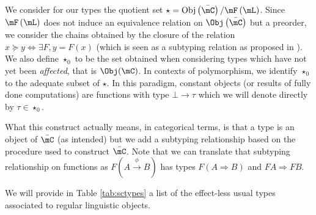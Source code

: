 \documentclass[math, english, info]{cours}
\begin{document}
We consider for our types the quotient set $\star = \mathrm{Obj}\left( \bar{\mC} \right)/\mF\left( \mL \right)$.
Since $\mF\left( \mL \right)$ does not induce an equivalence relation on $\Obj\left( \bar{\mC} \right)$ but a preorder, we consider the chains obtained by the closure of the relation $x\succeq y \Leftrightarrow \exists F, y = F(x)$ (which is seen as a subtyping relation as proposed in ).
We also define $\star_{0}$ to be the set obtained when considering types which have not yet been \emph{affected}, that is $\Obj(\mC)$.
In contexts of polymorphism, we identify $\star_{0}$ to the adequate subset of $\star$.
In this paradigm, constant objects (or results of fully done computations) are functions with type $\bot \to \tau$ which we will denote directly by $\tau \in \star_{0}$.

What this construct actually means, in categorical terms, is that a type is an object of $\bar{\mC}$ (as intended) but we add a subtyping relationship based on the procedure used to construct $\bar{\mC}$.
Note that we can translate that subtyping relationship on functions as $F\left( A \xrightarrow{\phi} B \right)$ has types $F\left( A\Rightarrow B \right)$ and $FA \Rightarrow FB$.

We will provide in Table \ref{tab:sctypes} a list of the effect-less usual types associated to regular linguistic objects.
\end{document}
